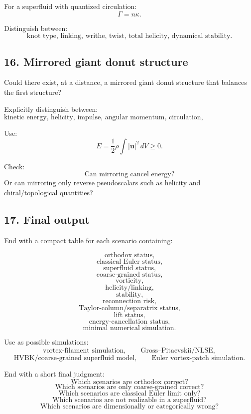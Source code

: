 \documentclass[11pt,a4paper]{article}
\begin{document}
For a superfluid with quantized circulation:
\[
\Gamma=n\kappa.
\]

Distinguish between:
\[
\text{knot type, linking, writhe, twist, total helicity, dynamical stability.}
\]

\subsection{16. Mirrored giant donut structure}

Could there exist, at a distance, a mirrored giant donut structure that balances the first structure?

Explicitly distinguish between:
\[
\text{kinetic energy, helicity, impulse, angular momentum, circulation, chiral/topological charge.}
\]

Use:
\[
E
=
\frac{1}{2}\rho\int |\mathbf{u}|^2\,dV
\geq0.
\]

Check:
\[
\text{Can mirroring cancel energy?}
\]
Or can mirroring only reverse pseudoscalars such as helicity and chiral/topological quantities?

\subsection{17. Final output}

End with a compact table for each scenario containing:

\[
\text{orthodox status,}
\]
\[
\text{classical Euler status,}
\]
\[
\text{superfluid status,}
\]
\[
\text{coarse-grained status,}
\]
\[
\text{vorticity,}
\]
\[
\text{helicity/linking,}
\]
\[
\text{stability,}
\]
\[
\text{reconnection risk,}
\]
\[
\text{Taylor-column/separatrix status,}
\]
\[
\text{lift status,}
\]
\[
\text{energy-cancellation status,}
\]
\[
\text{minimal numerical simulation.}
\]

Use as possible simulations:
\[
\text{vortex-filament simulation},
\qquad
\text{Gross--Pitaevskii/NLSE},
\]
\[
\text{HVBK/coarse-grained superfluid model},
\qquad
\text{Euler vortex-patch simulation}.
\]

End with a short final judgment:
\[
\text{Which scenarios are orthodox correct?}
\]
\[
\text{Which scenarios are only coarse-grained correct?}
\]
\[
\text{Which scenarios are classical Euler limit only?}
\]
\[
\text{Which scenarios are not realizable in a superfluid?}
\]
\[
\text{Which scenarios are dimensionally or categorically wrong?}
\]
\end{document}
